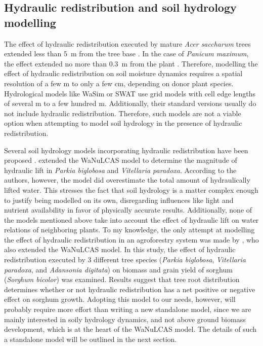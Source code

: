 \subsection{Hydraulic redistribution and soil hydrology modelling}

The effect of hydraulic redistribution executed by mature \emph{Acer saccharum} trees extended less than \SI{5}{\metre} from the tree base \parencite{dawson_hydraulic_1993}.  In the case of \emph{Panicum maximum}, the effect extended no more than \SI{0.3}{\metre} from the plant \parencite{sekiya_applying_2011}.  Therefore, modelling the effect of hydraulic redistribution on soil moisture dynamics requires a spatial resolution of a few \si{\metre} to only a few \si{\centi\metre}, depending on donor plant species.  Hydrological models like WaSim \parencite{schulla_hydrologische_1997} or SWAT \parencite{arnold_large_1998} use grid models with cell edge lengths of several \si{\metre} to a few hundred \si{\metre}.  Additionally, their standard versions usually do not include hydraulic redistribution.  Therefore, such models are not a viable option when attempting to model soil hydrology in the presence of hydraulic redistribution.

Several soil hydrology models incorporating hydraulic redistribution have been proposed \parencite[e.g.,][]{gou_groundwater-soil-plant-atmosphere_2014,ryel_hydraulic_2002}.
\textcite{bayala_hydraulic_2008} extended the WaNuLCAS model \parencite{noordwijk_wanulcas_2011} to determine the magnitude of hydraulic lift in \emph{Parkia biglobosa} and \emph{Vitellaria paradoxa}.  According to the authors, however, the model did overestimate the total amount of hydraulically lifted water.  This stresses the fact that soil hydrology is a matter complex enough to justify being modelled on its own, disregarding influences like light and nutrient availability in favor of physically accurate results.  Additionally, none of the models mentioned above take into account the effect of hydraulic lift on water relations of neighboring plants.  To my knowledge, the only attempt at modelling the effect of hydraulic redistribution in an agroforestry system was made by \textcite{coulibaly_crop_2014}, who also extended the WaNuLCAS model.  In this study, the effect of hydraulic redistribution executed by 3 different tree species (\emph{Parkia biglobosa}, \emph{Vitellaria paradoxa}, and \emph{Adansonia digitata}) on biomass and grain yield of sorghum (\emph{Sorghum bicolor}) was examined.  Results suggest that tree root distribution determines whether or not hydraulic redistribution has a net positive or negative effect on sorghum growth.  Adopting this model to our needs, however, will probably require more effort than writing a new standalone model, since we are mainly interested in soily hydrology dynamics, and not above ground biomass development, which is at the heart of the WaNuLCAS model.  The details of such a standalone model will be outlined in the next section.

